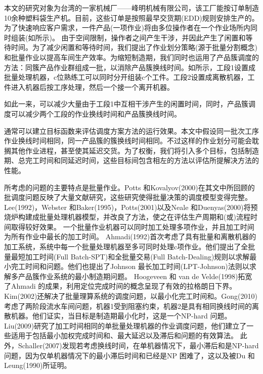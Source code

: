 本文的研究对象为台湾的一家机械厂——峰明机械有限公司，该工厂能按订单制造10余种塑料袋生产机。目前，这些订单是按照最早交货期(EDD)规则安排生产的。为了快速响应客户需求，一件产品(一项作业)将由多位操作者在一个作业场所内同时组装(如所示)。
由于空间限制，操作者之间产生干涉，并因此产生了闲置和等待时间。为了减少闲置和等待时间，我们提出了作业划分策略(源于批量分割概念)和批量作业以提高车间生产效率。为缩短制造期，我们同时也运用了产品簇调度的方法：同簇产品作业群组成一批，以消除产品簇换线时间。如所示，工段1设置成批量处理机器，c位熟练工可以同时分开组装c个工件。工段2设置成离散机器，工件进入机器后按工序处理，然后一个接一个离开机器。
\begin{figure}[h]
\begin{floatrow}[2]
\centering
{}
\end{floatrow}
\end{figure}
如此一来，可以减少大量由于工段1中互相干涉产生的闲置时间，同时，产品簇调度可以减少两个工段的作业换线时间和产品簇换线时间。

通常可以建立目标函数来评估调度方案方法的运行效果。本文中假设同一批次工序作业换线时间相同，同一产品簇的簇换线时间相同。不过这样的作业划分可能会耽搁其他作业进程，甚至使其延迟交货。为了权衡，我们将引入多个目标，包括制造期、总完工时间和同延迟时间，这些目标间包含相左的方法以评估所提解决方法的性能。

所考虑的问题的主要特点是批量作业。Potts 和Kovalyov(2000)在其文中所回顾的批调度问题反映了大量文献研究，这些研究使得批量决策的调度模型变得完整。Lee(1992)，Webster 和Baker(1995)，Potts(2001)以及Neale 和Duenyas(2000)将预烧炉构建成批量处理机器模型，并改良了方法，使之在评估生产周期和(或)流程时间取得较好效果。
一个批量作业机器可以同时加工处理多项作业，并且加工时间为所有作业中最长的加工时间。
Ahmadi(1992)首次考虑了具有批量和离散机器的加工系统，系统中每一个批量处理机器至多可同时处理c项作业。他们提出了全批量最短加工时间(Full Batch-SPT)和全批量交易(Full Batch-Dealing)规则以求解最小完工时间和问题。他们也提出了Johnson 最长加工时间(LPT-Johnson)法则以求解多产品簇作业系统的最小制造期问题。
Hoogeveen 和 van de Velde(1998)拓宽了Ahmadi 的成果，利用定位完成时间的概念呈现了有效的拉格朗日下界。Kim(2002)还解决了批量理算系统的调度问题，以最小化完工时间和。Gong(2010)考虑了两阶段流水车间问题，机器1受到阻塞约束，机器2是具有相同换线时间的离散机器。他们证实，当目标是制造期最小化时，这是一个NP-hard 问题。Liu(2009)研究了加工时间相同的单批量处理机器的作业调度问题，他们建立了一些适用于包括最小加权完成时间和、最大延迟以及滞后和问题的有效算法。
此外，Schaller(2007)发现若考虑换线时间，在单机器情况下，最小滞后和是NP-hard 问题，因为仅单机器情况下的最小滞后时间和已经是NP 困难了，这以及被Du 和Leung(1990)所证明。


